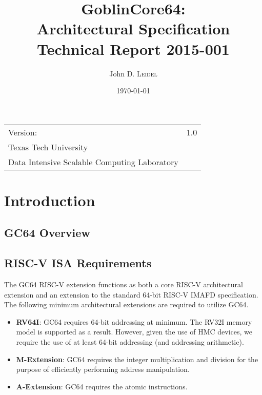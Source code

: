 \documentclass{article}
\title{GoblinCore64: \\ Architectural Specification \\ Technical Report 2015-001} %
\author{John D. \textsc{Leidel}} %
\date{\today} %
\begin{document}
\maketitle %

\begin{center}
\begin{tabular}{l r}
Version: & 1.0 \\ %
Texas Tech University \\ %
Data Intensive Scalable Computing Laboratory \\ %

\end{tabular}
\end{center}

\newpage

\tableofcontents

\newpage

\section{Introduction}

\subsection{GC64 Overview}

\subsection{RISC-V ISA Requirements}

The GC64 RISC-V extension functions as both a core RISC-V architectural extension and an extension to the standard 64-bit RISC-V IMAFD specification.  The following minimum architectural extensions are required to utilize GC64.  

\begin{itemize}
\item \textbf{RV64I}:  GC64 requires 64-bit addressing at minimum.  The RV32I memory model is supported as a result.  However, given the use of HMC devices, we require the use of at least 64-bit addressing (and addressing arithmetic).  
\item \textbf{M-Extension}:  GC64 requires the integer multiplication and division for the purpose of efficiently performing address manipulation.  
\item \textbf{A-Extension}: GC64 requires the atomic instructions.
\end{itemize}
\end{document}
